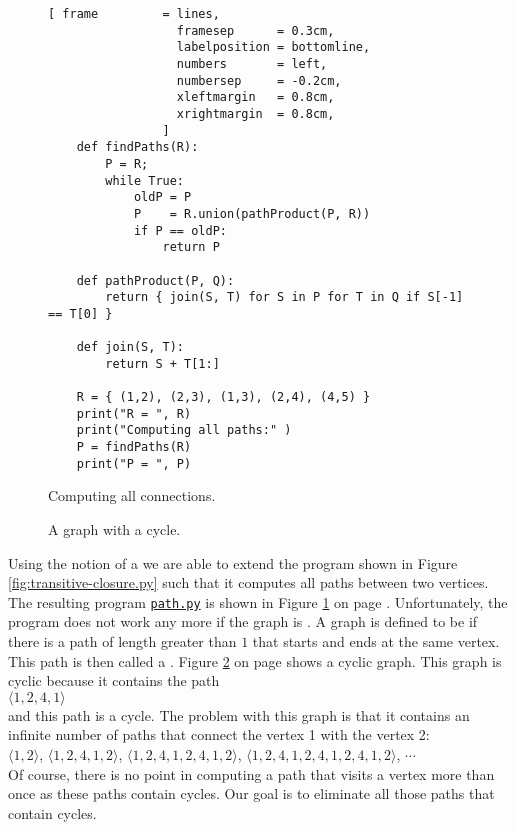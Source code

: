 \begin{figure}[!ht]
  \centering
\begin{Verbatim}[ frame         = lines, 
                  framesep      = 0.3cm, 
                  labelposition = bottomline,
                  numbers       = left,
                  numbersep     = -0.2cm,
                  xleftmargin   = 0.8cm,
                  xrightmargin  = 0.8cm,
                ]
    def findPaths(R):
        P = R;
        while True:
            oldP = P
            P    = R.union(pathProduct(P, R))
            if P == oldP:
                return P

    def pathProduct(P, Q):
        return { join(S, T) for S in P for T in Q if S[-1] == T[0] }
    
    def join(S, T):
        return S + T[1:]
    
    R = { (1,2), (2,3), (1,3), (2,4), (4,5) }
    print("R = ", R)
    print("Computing all paths:" )
    P = findPaths(R)
    print("P = ", P)
\end{Verbatim} 
\vspace*{-0.3cm}
\caption{Computing all connections.}  \label{fig:path.py}
\end{figure} %

\begin{figure}[!ht]
  \centering
  \vspace*{-9cm}

  \vspace*{-1cm}

  \caption{A graph with a cycle.}
  \label{fig:graph-zykl}
\end{figure}

Using the notion of a  we are able to extend the program shown in Figure
\ref{fig:transitive-closure.py} such that it computes all paths between two vertices.
The resulting program
\href{https://github.com/karlstroetmann/Logic/blob/master/Python/path.py}{\texttt{path.py}}
is shown in Figure \ref{fig:path.py} on page \pageref{fig:path.py}.
Unfortunately, the program does not work any more if the graph is .  A graph is defined
to be  if there is a path of length greater than $1$ that starts and ends at the same
vertex.  This path is then called a .
Figure \ref{fig:graph-zykl} on page \pageref{fig:graph-zykl} shows a cyclic graph.  This graph is
cyclic because it contains the path
\\[0.2cm]
\hspace*{1.3cm}
$\langle 1, 2, 4, 1 \rangle$
\\[0.2cm]
and this path is a cycle.
The problem with this graph is that it contains an infinite number of paths that connect the vertex
1 with the vertex 2: \\[0.2cm]
\hspace*{1.3cm}
$\langle 1, 2 \rangle$, $\langle 1, 2, 4, 1, 2 \rangle$, 
$\langle 1, 2, 4, 1, 2, 4, 1, 2 \rangle$, 
$\langle 1, 2, 4, 1, 2, 4, 1, 2, 4, 1, 2 \rangle$, $\cdots$
\\[0.2cm]
Of course, there is no point in computing a path that visits a vertex more than once as these paths
contain cycles.  Our goal is to eliminate all those paths that contain cycles.


